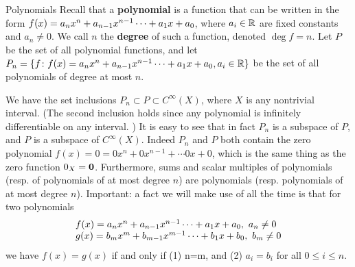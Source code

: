 \begin{frame}{Polynomials}\footnotesize
Recall that a {\bf polynomial} is a function that can be written in the form $f(x)=a_nx^n+a_{n-1}x^{n-1}\cdots +a_1x+a_0$, where $a_i\in{\mathbb R}$ are fixed constants and $a_n\ne 0$. We call $n$ the {\bf degree} of such a function, denoted $\deg f=n$. 
\bpause
Let $P$ be the set of all polynomial functions, and let $P_n=\{f\colon f(x)=a_nx^n+a_{n-1}x^{n-1}\cdots +a_1x+a_0, a_i\in{\mathbb R} \}$ be the set of all polynomials of degree \alert{at most} $n$. 

We have the set inclusions $P_n\subset P\subset C^\infty(X)$, where $X$ is any nontrivial interval. (The second inclusion holds since any polynomial is infinitely differentiable on any interval. )
\bpause
It is easy to see that in fact $P_n$ is a \alert{subspace} of $P$, and $P$ is a \alert{subspace} of $C^\infty(X)$. 
Indeed $P_n$ and $P$ both contain the zero polynomial $f(x)=0=0x^n+0x^{n-1}+\cdots 0x+0$, which is the same thing as the zero function $0_X={\mathbf 0}$. Furthermore, sums and scalar multiples of polynomials (resp. of polynomials of at most degree $n$) are polynomials (resp. polynomials of at most degree $n$). 
\bpause
\alert{Important:} a fact we will make use of all the time is that for two polynomials 
\[\begin{array}{l}
f(x)=a_nx^n+a_{n-1}x^{n-1}\cdots +a_1x+a_0, \ a_n\ne 0 \\
g(x)=b_mx^m+b_{m-1}x^{m-1}\cdots +b_1x+b_0, \ b_m\ne 0
\end{array}
\] 
we have $f(x)=g(x)$ if and only if (1) n=m, and (2) $a_i=b_i$ for all $0\leq i\leq n$. 
\end{frame}
